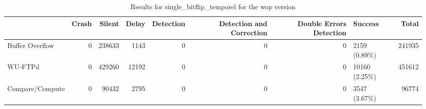\begin{table}[t]
	\centering
	\caption{Results for single_bitflip_temporel for the wop version}
	\label{table:end_sim_by_status_wop_1_single_bitflip_temporel}
	\begin{tabular}{lrrrrrrlr}
		\toprule
		                & Crash & Silent & Delay & Detection & Detection and Correction & Double Errors Detection & Success        & Total  \\
		\midrule
		Buffer Overflow & 0     & 238633 & 1143  & 0         & 0                        & 0                       & 2159 (0.89\%)  & 241935 \\
		WU-FTPd         & 0     & 429260 & 12192 & 0         & 0                        & 0                       & 10160 (2.25\%) & 451612 \\
		Compare/Compute & 0     & 90432  & 2795  & 0         & 0                        & 0                       & 3547 (3.67\%)  & 96774  \\
		\bottomrule
	\end{tabular}
\end{table}
